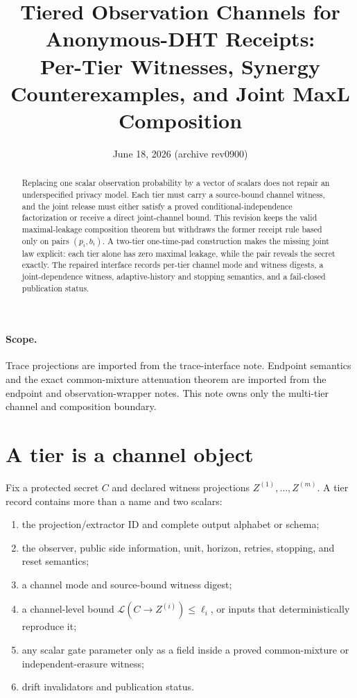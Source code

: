 \documentclass[11pt]{article}
\title{Tiered Observation Channels for Anonymous-DHT Receipts:\\
\large Per-Tier Witnesses, Synergy Counterexamples, and Joint MaxL Composition}
\author{}
\date{June 18, 2026 (archive rev0900)}
\theoremstyle{definition}
\newcommand{\MaxL}{\mathcal{L}}
\begin{document}
\maketitle

\begin{abstract}
Replacing one scalar observation probability by a vector of scalars does not repair an underspecified privacy model. Each tier must carry a source-bound channel witness, and the joint release must either satisfy a proved conditional-independence factorization or receive a direct joint-channel bound. This revision keeps the valid maximal-leakage composition theorem but withdraws the former receipt rule based only on pairs \((p_i,b_i)\). A two-tier one-time-pad construction makes the missing joint law explicit: each tier alone has zero maximal leakage, while the pair reveals the secret exactly. The repaired interface records per-tier channel mode and witness digests, a joint-dependence witness, adaptive-history and stopping semantics, and a fail-closed publication status.
\end{abstract}

\paragraph{Scope.}
Trace projections are imported from the trace-interface note. Endpoint semantics and the exact common-mixture attenuation theorem are imported from the endpoint and observation-wrapper notes. This note owns only the multi-tier channel and composition boundary.\cite{series:traceifaces,series:endpointbridge,series:oddsinflation,series:obsatten,series:receiptitems}

\section{A tier is a channel object}\label{sec:tier}
Fix a protected secret \(C\) and declared witness projections \(Z^{(1)},\ldots,Z^{(m)}\). A tier record contains more than a name and two scalars:
\begin{enumerate}[leftmargin=*]
\item the projection/extractor ID and complete output alphabet or schema;
\item the observer, public side information, unit, horizon, retries, stopping, and reset semantics;
\item a channel mode and source-bound witness digest;
\item a channel-level bound \(\MaxL(C\to Z^{(i)})\le \ell_i\), or inputs that deterministically reproduce it;
\item any scalar gate parameter only as a field inside a proved common-mixture or independent-erasure witness;
\item drift invalidators and publication status.
\end{enumerate}
\end{document}
